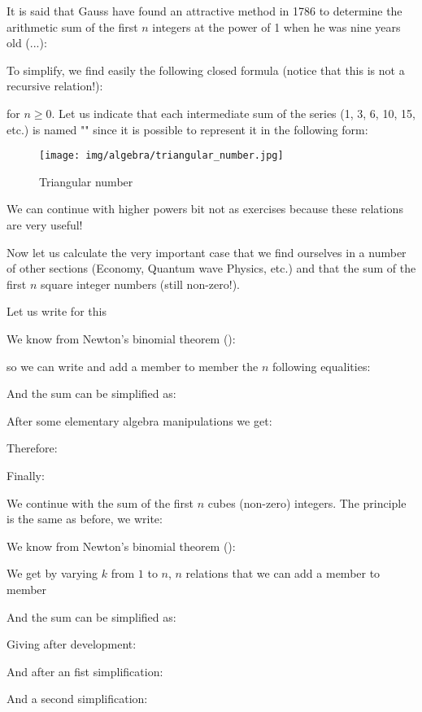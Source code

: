 	It is said that Gauss have found an attractive method in 1786 to determine the arithmetic sum of the first $n$ integers at the power of 1 when he was nine years old (...):
	
	To simplify, we find easily the following closed formula (notice that this is not a recursive relation!):
	
	for $n \geq 0$. Let us indicate that each intermediate sum of the series (1, 3, 6, 10, 15, etc.) is named "" since it is possible to represent it in the following form:

	\begin{figure}[H]
		\centering
		\texttt{[image: img/algebra/triangular\_number.jpg]}
		\caption{Triangular number}
	\end{figure}

	We can continue with higher powers bit not as exercises because these relations are very useful!

	Now let us calculate the very important case that we find ourselves in a number of other sections (Economy, Quantum wave Physics, etc.) and that  the sum of the first $n$ square integer numbers (still non-zero!).

	Let us write for this\label{sum of squares integers}
	
	We know from Newton's binomial theorem ():
	
	so we can write and add a member to member the $n$ following equalities:
	
	And the sum can be simplified as:
	
	After some elementary algebra manipulations we get:
	
	Therefore:
	
	Finally:
	
	We continue with the sum of the first $n$ cubes (non-zero) integers. The principle is the same as before, we write:
	
	We know from Newton's binomial theorem ():
	
	We get by varying $k$ from $1$ to $n$, $n$ relations that we can add a member to member
	
	And the sum can be simplified as:
	
	Giving after development:
	
	And after an fist simplification:
	
	And a second simplification:
	
